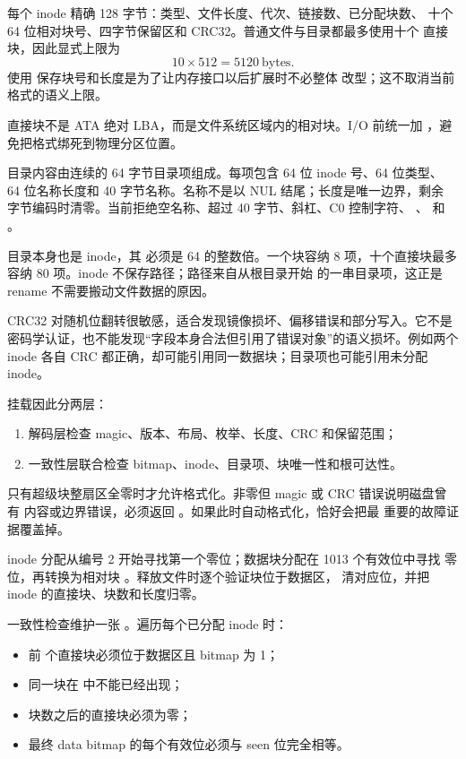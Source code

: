 每个 inode 精确 128 字节：类型、文件长度、代次、链接数、已分配块数、
十个 64 位相对块号、四字节保留区和 CRC32。普通文件与目录都最多使用十个
直接块，因此显式上限为
\[
  10\times512=5120\ \text{bytes}.
\]
使用  保存块号和长度是为了让内存接口以后扩展时不必整体
改型；这不取消当前格式的语义上限。

直接块不是 ATA 绝对 LBA，而是文件系统区域内的相对块。I/O 前统一加
，避免把格式绑死到物理分区位置。

目录内容由连续的 64 字节目录项组成。每项包含 64 位 inode 号、64 位类型、
64 位名称长度和 40 字节名称。名称不是以 NUL 结尾；长度是唯一边界，剩余
字节编码时清零。当前拒绝空名称、超过 40 字节、斜杠、C0 控制字符、
、 和 。

目录本身也是 inode，其  必须是 64 的整数倍。一个块容纳
8 项，十个直接块最多容纳 80 项。inode 不保存路径；路径来自从根目录开始
的一串目录项，这正是 rename 不需要搬动文件数据的原因。

CRC32 对随机位翻转很敏感，适合发现镜像损坏、偏移错误和部分写入。它不是
密码学认证，也不能发现“字段本身合法但引用了错误对象”的语义损坏。例如两个
inode 各自 CRC 都正确，却可能引用同一数据块；目录项也可能引用未分配 inode。

挂载因此分两层：

\begin{enumerate}[label=\arabic*.]
  \item 解码层检查 magic、版本、布局、枚举、长度、CRC 和保留范围；
  \item 一致性层联合检查 bitmap、inode、目录项、块唯一性和根可达性。
\end{enumerate}

只有超级块整扇区全零时才允许格式化。非零但 magic 或 CRC 错误说明磁盘曾有
内容或边界错误，必须返回 。如果此时自动格式化，恰好会把最
重要的故障证据覆盖掉。

inode 分配从编号 2 开始寻找第一个零位；数据块分配在 1013 个有效位中寻找
零位，再转换为相对块 。释放文件时逐个验证块位于数据区，
清对应位，并把 inode 的直接块、块数和长度归零。

一致性检查维护一张 。遍历每个已分配 inode 时：

\begin{itemize}
  \item 前  个直接块必须位于数据区且 bitmap 为 1；
  \item 同一块在  中不能已经出现；
  \item 块数之后的直接块必须为零；
  \item 最终 data bitmap 的每个有效位必须与 seen 位完全相等。
\end{itemize}

